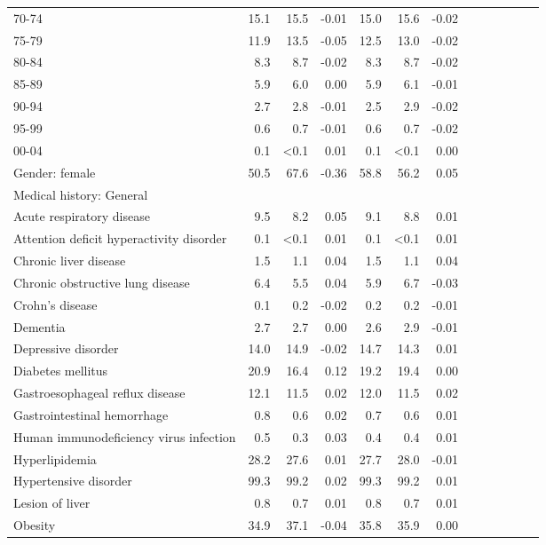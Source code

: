 \documentclass[11pt,]{article}
\begin{document}
\begin{longtable}{lrrrrrrrrrrrr}
      70-74 & 15.1 & 15.5 & -0.01 & 15.0 & 15.6 & -0.02 \\ 
      75-79 & 11.9 & 13.5 & -0.05 & 12.5 & 13.0 & -0.02 \\ 
      80-84 &  8.3 &  8.7 & -0.02 &  8.3 &  8.7 & -0.02 \\ 
      85-89 &  5.9 &  6.0 &  0.00 &  5.9 &  6.1 & -0.01 \\ 
      90-94 &  2.7 &  2.8 & -0.01 &  2.5 &  2.9 & -0.02 \\ 
      95-99 &  0.6 &  0.7 & -0.01 &  0.6 &  0.7 & -0.02 \\ 
      00-04 &  0.1 & <0.1 &  0.01 &  0.1 & <0.1 &  0.00 \\ 
  Gender: female & 50.5 & 67.6 & -0.36 & 58.8 & 56.2 &  0.05 \\ 
  Medical history: General &    &    &     &    &    &     \\ 
      Acute respiratory disease &  9.5 &  8.2 &  0.05 &  9.1 &  8.8 &  0.01 \\ 
      Attention deficit hyperactivity disorder &  0.1 & <0.1 &  0.01 &  0.1 & <0.1 &  0.01 \\ 
      Chronic liver disease &  1.5 &  1.1 &  0.04 &  1.5 &  1.1 &  0.04 \\ 
      Chronic obstructive lung disease &  6.4 &  5.5 &  0.04 &  5.9 &  6.7 & -0.03 \\ 
      Crohn's disease &  0.1 &  0.2 & -0.02 &  0.2 &  0.2 & -0.01 \\ 
      Dementia &  2.7 &  2.7 &  0.00 &  2.6 &  2.9 & -0.01 \\ 
      Depressive disorder & 14.0 & 14.9 & -0.02 & 14.7 & 14.3 &  0.01 \\ 
      Diabetes mellitus & 20.9 & 16.4 &  0.12 & 19.2 & 19.4 &  0.00 \\ 
      Gastroesophageal reflux disease & 12.1 & 11.5 &  0.02 & 12.0 & 11.5 &  0.02 \\ 
      Gastrointestinal hemorrhage &  0.8 &  0.6 &  0.02 &  0.7 &  0.6 &  0.01 \\ 
      Human immunodeficiency virus infection &  0.5 &  0.3 &  0.03 &  0.4 &  0.4 &  0.01 \\ 
      Hyperlipidemia & 28.2 & 27.6 &  0.01 & 27.7 & 28.0 & -0.01 \\ 
      Hypertensive disorder & 99.3 & 99.2 &  0.02 & 99.3 & 99.2 &  0.01 \\ 
      Lesion of liver &  0.8 &  0.7 &  0.01 &  0.8 &  0.7 &  0.01 \\ 
      Obesity & 34.9 & 37.1 & -0.04 & 35.8 & 35.9 &  0.00 \\ 

\end{longtable}
\end{document}
